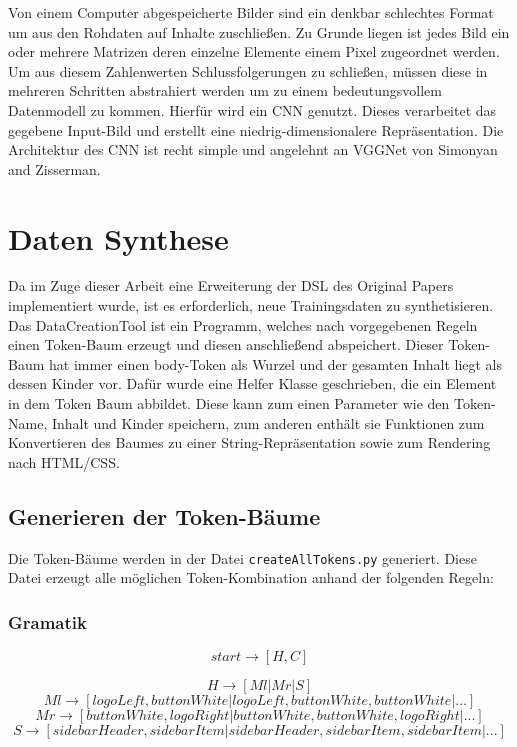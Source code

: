 \documentclass[pdftex,a4paper,halfparskip, article]{scrartcl}
\begin{document}
Von einem Computer abgespeicherte Bilder sind ein denkbar schlechtes Format um aus den Rohdaten auf Inhalte zuschließen. Zu Grunde liegen ist jedes Bild ein oder mehrere Matrizen deren einzelne Elemente einem Pixel zugeordnet werden. Um aus diesem Zahlenwerten Schlussfolgerungen zu schließen, müssen diese in mehreren Schritten abstrahiert werden um zu einem bedeutungsvollem Datenmodell zu kommen. Hierfür wird ein CNN genutzt. Dieses verarbeitet das gegebene Input-Bild und erstellt eine niedrig-dimensionalere Repräsentation. Die Architektur des CNN ist recht simple und angelehnt an VGGNet von Simonyan and Zisserman. 

\section{Daten Synthese}

Da im Zuge dieser Arbeit eine Erweiterung der DSL des Original Papers implementiert wurde, ist es erforderlich, neue Trainingsdaten zu synthetisieren. Das DataCreationTool ist ein Programm, welches nach vorgegebenen Regeln einen Token-Baum erzeugt und diesen anschließend abspeichert. Dieser Token-Baum hat immer einen body-Token als Wurzel und der gesamten Inhalt liegt als dessen Kinder vor. Dafür wurde eine Helfer Klasse geschrieben, die ein Element in dem Token Baum abbildet. Diese kann zum einen Parameter wie den Token-Name, Inhalt und Kinder speichern, zum anderen enthält sie Funktionen zum Konvertieren des Baumes zu einer String-Repräsentation sowie zum Rendering nach HTML/CSS. 

\subsection{Generieren der Token-Bäume}
Die Token-Bäume werden in der Datei \texttt{createAllTokens.py} generiert. Diese Datei erzeugt alle möglichen Token-Kombination anhand der folgenden Regeln:

\subsubsection{Gramatik}

\begin{equation}
start \rightarrow [H,C]
\end{equation}

\begin{equation}
H \rightarrow [Ml | Mr | S]
\end{equation}
\begin{equation}
Ml \rightarrow  [ logoLeft, buttonWhite | logoLeft, buttonWhite, buttonWhite | ...]
\end{equation}
\begin{equation}
Mr \rightarrow [buttonWhite, logoRight | buttonWhite, buttonWhite, logoRight | ...]
\end{equation}
\begin{equation}
S \rightarrow [sidebarHeader, sidebarItem| sidebarHeader, sidebarItem, sidebarItem | ...]
\end{equation}
\end{document}
